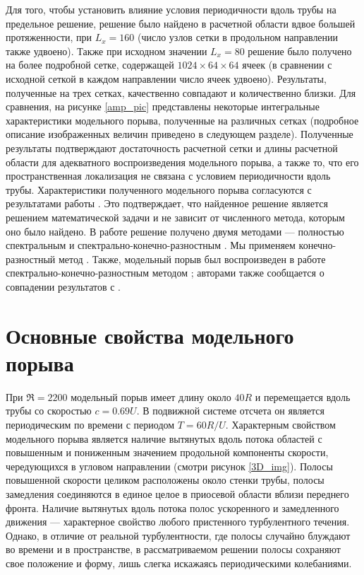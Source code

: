 Для того, чтобы установить влияние условия периодичности вдоль трубы на предельное решение, решение было найдено в расчетной области вдвое большей протяженности, при $L_x = 160$ (число узлов сетки в продольном направлении также удвоено). Также при исходном значении $L_x = 80$ решение было получено на более подробной сетке, содержащей $1024 \times 64 \times 64$ ячеек (в сравнении с исходной сеткой в каждом направлении число ячеек удвоено). Результаты, полученные на трех сетках, качественно совпадают и количественно близки. Для сравнения, на рисунке \ref{amp_pic} представлены некоторые интегральные характеристики модельного порыва, полученные на различных сетках (подробное описание изображенных величин приведено в следующем разделе). Полученные результаты подтверждают достаточность расчетной сетки и длины расчетной области для адекватного воспроизведения модельного порыва, а также то, что его пространственная локализация не связана с условием периодичности вдоль трубы. Характеристики полученного модельного порыва согласуются с результатами работы \cite{Avila2013}. Это подтверждает, что найденное решение является решением математической задачи и не зависит от численного метода, которым оно было найдено. В работе \cite{Avila2013} решение получено двумя методами --- полностью спектральным \cite{Meseguer2007} и спектрально-конечно-разностным \cite{Willis2009}. Мы применяем конечно-разностный метод \cite{Nikitin2006}. Также, модельный порыв был воспроизведен в работе \cite{Chantry2014} спектрально-конечно-разностным методом \cite{Willis2009}; авторами также сообщается о совпадении результатов с \cite{Avila2013}. 


\section{Основные свойства модельного порыва} \label{edge_char_seq}

При $\Re=2200$ модельный порыв имеет длину около $40R$ и перемещается вдоль трубы со скоростью $c = 0.69U$. В подвижной системе отсчета он является периодическим по времени с периодом $T = 60 R/U$. Характерным свойством модельного порыва является наличие вытянутых вдоль потока областей с повышенным и пониженным значением продольной компоненты скорости, чередующихся в угловом направлении (смотри рисунок \ref{3D_img}). Полосы повышенной скорости целиком расположены около стенки трубы, полосы замедления соединяются в единое целое в приосевой области вблизи переднего фронта. Наличие вытянутых вдоль потока полос ускоренного и замедленного движения --- характерное свойство любого пристенного турбулентного течения. Однако, в отличие от реальной турбулентности, где полосы случайно блуждают во времени и в пространстве, в рассматриваемом решении полосы сохраняют свое положение и форму, лишь слегка искажаясь периодическими колебаниями. 

